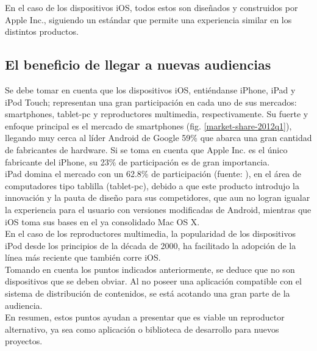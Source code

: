 En el caso de los dispositivos iOS, todos estos son diseñados y construidos por Apple Inc., siguiendo un estándar que permite una experiencia similar en los distintos productos.

\subsection{El beneficio de llegar a nuevas audiencias}
Se debe tomar en cuenta que los dispositivos iOS, entiéndanse iPhone, iPad y iPod Touch; representan una gran participación en cada uno de sus mercados: smartphones, tablet-pc y reproductores  multimedia, respectivamente. Su fuerte y enfoque principal es el mercado de smartphones (fig. \ref{market-share-2012q1}), llegando muy cerca al líder Android de Google 59\% que abarca una gran cantidad de fabricantes de hardware. Si se toma en cuenta que Apple Inc. es el único fabricante del iPhone, su 23\% de participación es de gran importancia.\\

iPad domina el mercado con un 62.8\% de participación (fuente: \cite{sota:iPad-market}), en el área de computadores tipo tablilla (tablet-pc), debido a que este producto introdujo la innovación y la pauta de diseño para sus competidores, que aun no logran igualar la experiencia para el usuario con versiones modificadas de Android, mientras que iOS toma sus bases en el ya consolidado Mac OS X.\\

En el caso de los reproductores multimedia, la popularidad de los dispositivos iPod desde los principios de la década de 2000, ha facilitado la adopción de la línea más reciente que también corre iOS.\\

Tomando en cuenta los puntos indicados anteriormente, se deduce que no son dispositivos que se deben obviar. Al no poseer una aplicación compatible con el sistema de distribución de contenidos, se está acotando una gran parte de la audiencia.\\

En resumen, estos puntos ayudan a presentar que es viable un reproductor alternativo, ya sea como aplicación o biblioteca de desarrollo para nuevos proyectos. \\

